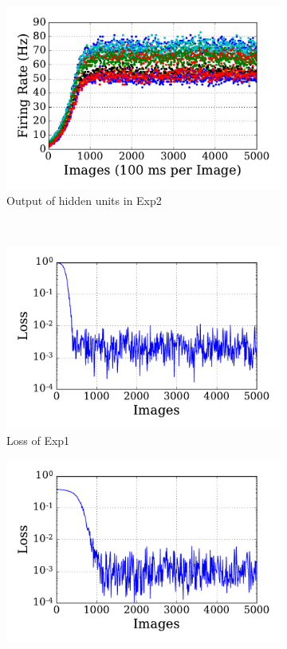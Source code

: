 \begin{figure}
\begin{subfigure}[t]{0.48\textwidth}
		\includegraphics[width=\textwidth]{pics_sdlm/13_exp_SRBM_noise_long/exp2_hid_s.pdf}
		\caption{Output of hidden units in Exp2}
	\end{subfigure}\\
	\begin{subfigure}[t]{0.48\textwidth}
		\includegraphics[width=\textwidth]{pics_sdlm/13_exp_SRBM_noise_long/exp1_mse_nons.pdf}
		\caption{Loss of Exp1}
	\end{subfigure}
	\begin{subfigure}[t]{0.48\textwidth}
		\includegraphics[width=\textwidth]{pics_sdlm/13_exp_SRBM_noise_long/exp2_mse_nons.pdf}

\end{subfigure}
\end{figure}
